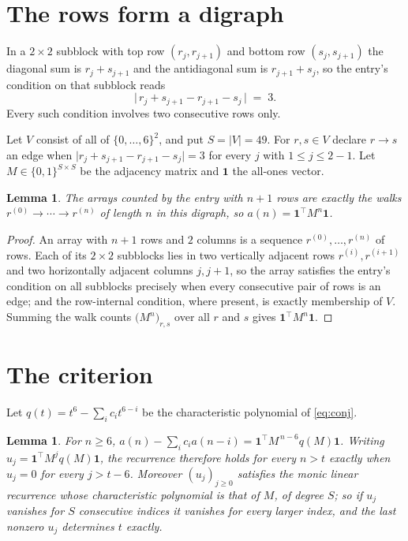 \documentclass[11pt,a4paper]{article}
\theoremstyle{plain}
\newtheorem{lemma}[theorem]{Lemma}
\theoremstyle{definition}
\begin{document}
\section{The rows form a digraph}

In a $2\times2$ subblock with top row $(r_j,r_{j+1})$ and bottom row $(s_j,s_{j+1})$ the
diagonal sum is $r_j+s_{j+1}$ and the antidiagonal sum is $r_{j+1}+s_j$, so the entry's
condition on that subblock reads
\[
\bigl|\,r_j+s_{j+1}-r_{j+1}-s_j\,\bigr|\;=\;3.
\]
Every such condition involves two consecutive rows only.

Let $V$ consist of all of $\{0,\dots,6\}^{2}$, and put $S=|V|=49$. For $r,s\in V$ declare $r\to s$ an edge
when $\bigl|r_j+s_{j+1}-r_{j+1}-s_j\bigr|=3$ for every $j$ with
$1\le j\le2-1$. Let $M\in\{0,1\}^{S\times S}$ be the adjacency matrix and $\mathbf{1}$
the all-ones vector.

\begin{lemma}\label{lem:walk}
The arrays counted by the entry with $n+1$ rows are exactly the walks
$r^{(0)}\to\cdots\to r^{(n)}$ of length $n$ in this digraph, so
$a(n)=\mathbf{1}^{\!\top}M^{n}\mathbf{1}$.
\end{lemma}

\begin{proof}
An array with $n+1$ rows and $2$ columns is a sequence $r^{(0)},\dots,r^{(n)}$ of
rows. Each of its $2\times2$ subblocks lies in two vertically adjacent rows
$r^{(i)},r^{(i+1)}$ and two horizontally adjacent columns $j,j+1$, so the array satisfies
the entry's condition on all subblocks precisely when every consecutive pair of rows is an
edge; and the row-internal condition, where present, is exactly membership of $V$. Summing
the walk counts $\bigl(M^{n}\bigr)_{r,s}$ over all $r$ and $s$ gives
$\mathbf{1}^{\!\top}M^{n}\mathbf{1}$.
\end{proof}

\section{The criterion}

Let $q(t)=t^{6}-\sum_i c_i t^{6-i}$ be the characteristic polynomial of
\eqref{eq:conj}.

\begin{lemma}\label{lem:crit}
For $n\ge6$,
$a(n)-\sum_i c_i a(n-i)=\mathbf{1}^{\!\top}M^{\,n-6}q(M)\mathbf{1}$. Writing
$u_j=\mathbf{1}^{\!\top}M^{j}q(M)\mathbf{1}$, the recurrence therefore holds for every
$n>t$ exactly when $u_j=0$ for every $j>t-6$. Moreover $(u_j)_{j\ge0}$ satisfies the
monic linear recurrence whose characteristic polynomial is that of $M$, of degree $S$; so
if $u_j$ vanishes for $S$ consecutive indices it vanishes for every larger index, and the
last nonzero $u_j$ determines $t$ exactly.
\end{lemma}
\end{document}
